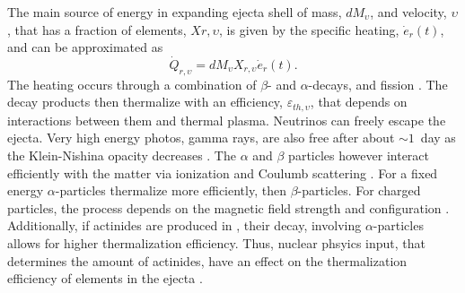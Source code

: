 
The main source of energy in expanding ejecta shell of mass, $dM_{\upsilon}$,
and velocity, $\upsilon$, that has a fraction of \rproc{} elements, $X{r,\upsilon}$, 
is given by the specific heating, $\dot{e}_r(t)$, and can be approximated as 
%
\begin{equation}
\dot{Q}_{r,\upsilon} = dM_{\upsilon}X_{r,\upsilon}\dot{e}_{r}(t).
\end{equation}
%
The heating occurs through a combination of $\beta$- and $\alpha$-decays, 
and fission \citep{Metzger:2010,Barnes:2016umi,Hotokezaka:2017dbk}. 
The decay products then thermalize with an efficiency, $\varepsilon_{th,\upsilon}$, 
that depends on interactions between them and thermal plasma. 
Neutrinos can freely escape the ejecta. Very high energy photos, gamma rays, 
are also free after about ${\sim}1$~day as the Klein-Nishina opacity decreases 
\citep{Hotokezaka:2017dbk,Barnes:2016umi}.
%
The $\alpha$ and $\beta$ particles however interact efficiently with the matter via 
ionization \citep{Barnes:2016umi} and Coulumb scattering \citep{Metzger:2010}.
For a fixed energy $\alpha$-particles thermalize more efficiently, then 
$\beta$-particles. For charged particles, the process depends on the magnetic 
field strength and configuration \citep{Barnes:2016umi}. 
%
Additionally, if actinides are produced in \rproc{}, their decay, 
involving $\alpha$-particles allows for higher thermalization efficiency. 
Thus, nuclear phsyics input, that determines the amount of actinides, 
have an effect on the thermalization efficiency of \rproc{} elements in the ejecta
\citep{Barnes:2020nfi}.
%
